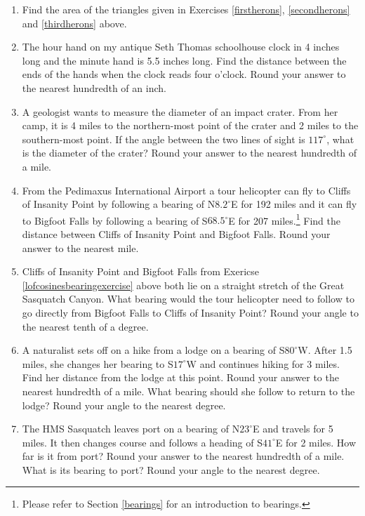 \documentclass{ximera}
\begin{document}
\begin{enumerate}

\setcounter{enumi}{\value{HW}}

\item Find the area of the triangles given in Exercises \ref{firstherons}, \ref{secondherons} and \ref{thirdherons} above.

\item The hour hand on my antique Seth Thomas schoolhouse clock in 4 inches long and the minute hand is 5.5 inches long.  Find the distance between the ends of the hands when the clock reads four o'clock.  Round your answer to the nearest hundredth of an inch.

\item A geologist wants to measure the diameter of an impact crater.   From her camp, it is 4 miles to the northern-most point of the crater and 2 miles to the southern-most point.  If the angle between the two lines of sight is $117^{\circ}$, what is the diameter of the crater?  Round your answer to the nearest hundredth of a mile.

\item From the Pedimaxus International Airport a tour helicopter can fly to Cliffs of Insanity Point by following a bearing of N$8.2^{\circ}$E for 192 miles and it can fly to Bigfoot Falls by following a bearing of S$68.5^{\circ}$E for 207 miles.\footnote{Please refer to Section \ref{bearings} for an introduction to bearings.}  Find the distance between Cliffs of Insanity Point and Bigfoot Falls.  Round your answer to the nearest mile.  \label{lofcosinesbearingexercise}

\item Cliffs of Insanity Point and Bigfoot Falls from Exericse \ref{lofcosinesbearingexercise} above both lie on a straight stretch of the Great Sasquatch Canyon.  What bearing would the tour helicopter need to follow to go directly from Bigfoot Falls to Cliffs of Insanity Point?  Round your angle to the nearest tenth of a degree.

\item  A naturalist sets off on a hike from a lodge on a bearing of S$80^{\circ}$W.  After 1.5 miles, she changes her bearing to S$17^{\circ}$W and continues hiking for 3 miles.  Find her distance from the lodge at this point.  Round your answer to the nearest hundredth of a mile.  What bearing should she follow to return to the lodge?  Round your angle to the nearest degree.

\item The HMS Sasquatch leaves port on a bearing of N$23^{\circ}$E and travels for 5 miles.  It then changes course and follows a heading of S$41^{\circ}$E for 2 miles.  How far is it from port? Round your answer to the nearest hundredth of a mile. What is its bearing to port?  Round your angle to the nearest degree.


\end{enumerate}
\end{document}
